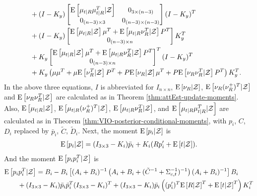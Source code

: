 \begin{theorem}
\begin{align}
		&\qquad + (I-K_y) \begin{bmatrix} \mathrm{E}\left[ \mu_{t|R}\mu_{t|R}^T|\mathcal{Z} \right] & 0_{3\times (n-3)} \\ 0_{(n-3)\times 3} & 0_{(n-3)\times (n-3)} \end{bmatrix} (I-K_y)^T \nonumber \\
		&\qquad + (I-K_y) \begin{bmatrix} \mathrm{E}\left[ \mu_{t|R}|\mathcal{Z} \right]\mu^T + \mathrm{E}\left[ \mu_{t|R}\nu_R^T|\mathcal{Z} \right]P^T \\ 0_{(n-3)\times n} \end{bmatrix} K_y^T \nonumber \\
		&\qquad + K_y \begin{bmatrix} \mathrm{E}\left[ \mu_{t|R}|\mathcal{Z} \right]\mu^T + \mathrm{E}\left[ \mu_{t|R}\nu_R^T|\mathcal{Z} \right]P^T \\ 0_{(n-3)\times n} \end{bmatrix}^T (I-K_y)^T \nonumber \\
		&\qquad + K_y\left( \mu\mu^T + \mu\mathrm{E}\left[ \nu_R^T|\mathcal{Z} \right] P^T + P\mathrm{E}\left[ \nu_R|\mathcal{Z} \right]\mu^T + P\mathrm{E}\left[ \nu_R\nu_R^T|\mathcal{Z} \right]P^T \right)K_y^T.
	\end{align}
	In the above three equations, $I$ is abbreviated for $I_{n\times n}$, $\mathrm{E}\left[ \nu_R|\mathcal{Z} \right]$, $\mathrm{E}\left[ \nu_R(\nu_R^+)^T|\mathcal{Z} \right]$ and $\mathrm{E}\left[ \nu_R\nu_R^T|\mathcal{Z} \right]$ are calculated as in Theorem \ref{thm:attEst-update-moments}.
	Also, $\mathrm{E}\left[ \mu_{t|R}|\mathcal{Z} \right]$, $\mathrm{E}\left[ \mu_{t|R}(\nu_R^+)^T|\mathcal{Z} \right]$, $\mathrm{E}\left[ \mu_{t|R}\nu_R^T|\mathcal{Z} \right]$, and $\mathrm{E}\left[ \mu_{t|R}\mu_{t|R}^T|\mathcal{Z} \right]$ are calculated as in Theorem \ref{thm:VIO-posterior-conditional-moments}, with $p_i$, $C$, $D_i$ replaced by $\bar{p}_i$, $\tilde{C}$, $\tilde{D}_i$.
	Next, the moment $\mathrm{E}\left[ p_i|\mathcal{Z} \right]$ is
	\begin{align}
		\mathrm{E}\left[ p_i|\mathcal{Z} \right] = (I_{3\times 3} - K_i) \bar{p}_i + K_i(Rp'_i + \mathrm{E}\left[ t|\mathcal{Z} \right]).
	\end{align}
	And the moment $\mathrm{E}\left[ p_ip_i^T|\mathcal{Z} \right]$ is
	\begin{align}
		&\expect{p_ip_i^T|\mathcal{Z}} = B_i - B_i\left[ (A_i+B_i)^{-1} \left( A_i + B_i + (\tilde{C}^{-1} + \Sigma_{c,t}^{-1})^{-1} \right) (A_i+B_i)^{-1} \right] B_i \nonumber \\
		&\qquad + (I_{3\times 3} - K_i) \bar{p}_i\bar{p}_i^T (I_{3\times 3} - K_i)^T + (I_{3\times 3} - K_i)\bar{p}_i \left((p'_i)^T\expect{R|\mathcal{Z}}^T + \expect{t|\mathcal{Z}}^T\right) K_i^T \nonumber \\

\end{align}
\end{theorem}
